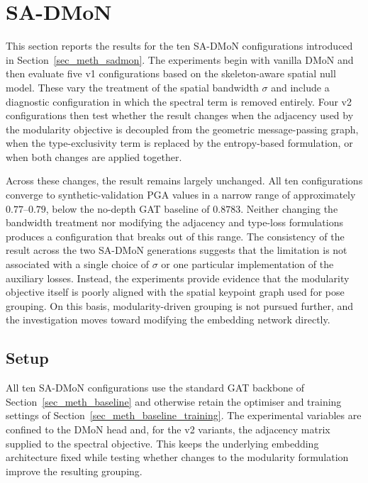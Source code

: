 \section{SA-DMoN}
\label{sec_res_sadmon}

This section reports the results for the ten SA-DMoN configurations
introduced in Section~\ref{sec_meth_sadmon}.
The experiments begin with vanilla DMoN
and then evaluate five v1 configurations based on the skeleton-aware
spatial null model.
These vary the treatment of the spatial bandwidth $\sigma$
and include a diagnostic configuration in which the spectral term
is removed entirely.
Four v2 configurations then test whether the result changes
when the adjacency used by the modularity objective is decoupled
from the geometric message-passing graph,
when the type-exclusivity term is replaced by the entropy-based
formulation,
or when both changes are applied together.

Across these changes, the result remains largely unchanged.
All ten configurations converge to synthetic-validation PGA values
in a narrow range of approximately $0.77$--$0.79$,
below the no-depth GAT baseline of $0.8783$.
Neither changing the bandwidth treatment nor modifying the adjacency
and type-loss formulations produces a configuration that breaks out
of this range.
The consistency of the result across the two SA-DMoN generations
suggests that the limitation is not associated with a single choice
of $\sigma$ or one particular implementation of the auxiliary losses.
Instead, the experiments provide evidence that the modularity objective
itself is poorly aligned with the spatial keypoint graph used
for pose grouping.
On this basis, modularity-driven grouping is not pursued further,
and the investigation moves toward modifying the embedding network
directly.

\subsection{Setup}
\label{sec_res_sadmon_setup}

All ten SA-DMoN configurations use the standard GAT backbone of
Section~\ref{sec_meth_baseline}
and otherwise retain the optimiser and training settings of
Section~\ref{sec_meth_baseline_training}.
The experimental variables are confined to the DMoN head and,
for the v2 variants, the adjacency matrix supplied to the spectral objective.
This keeps the underlying embedding architecture fixed
while testing whether changes to the modularity formulation improve
the resulting grouping.

